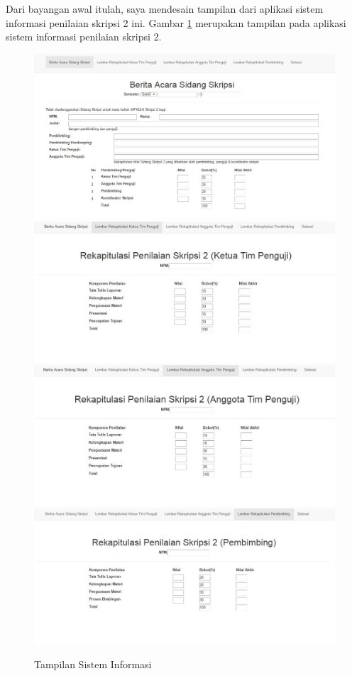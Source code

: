 	Dari bayangan awal itulah, saya mendesain tampilan dari aplikasi sistem informasi penilaian skripsi 2 ini. Gambar \ref{fig:tampilanapp} merupakan tampilan pada aplikasi sistem informasi penilaian skripsi 2.
	
	\begin{figure}[H]
		\centering
		\includegraphics[scale=0.45]{Gambar/tampilanapp1}
		\includegraphics[scale=0.45]{Gambar/tampilanapp2}
		\includegraphics[scale=0.45]{Gambar/tampilanapp3}
		\includegraphics[scale=0.45]{Gambar/tampilanapp4}
		\caption{Tampilan Sistem Informasi}
		\label{fig:tampilanapp}
	\end{figure}